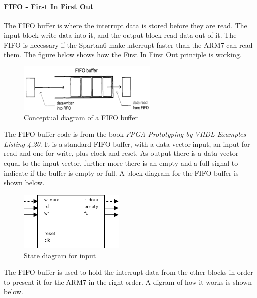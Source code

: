 \paragraph{FIFO - First In First Out}
The FIFO buffer is where the interrupt data is stored before they are read. The input block write data into it, and the output block read data out of it. The FIFO is necessary if the Spartan6 make interrupt faster than the ARM7 can read them. The figure below shows how the First In First Out principle is working.
\begin{figure}[H]
	\begin{centering}
		\includegraphics[width=0.6\textwidth]{images/tb5_fifo.png}
		\caption{Conceptual diagram of a FIFO buffer}
	\end{centering}
\end{figure}
The FIFO buffer code is from the book \textit{FPGA Prototyping by VHDL Examples - Listing 4.20}. It is a standard FIFO buffer, with a data vector input, an input for read and one for write, plus clock and reset. As output there is a data vector equal to the input vector, further more there is an empty and a full signal to indicate if the buffer is empty or full. A block diagram for the FIFO buffer is shown below.
\begin{figure}[H]
	\begin{centering}
		\includegraphics[width=0.45\textwidth]{images/tb5_fifo_block.png}
		\caption{State diagram for input}
	\end{centering}
\end{figure}
The FIFO buffer is used to hold the interrupt data from the other blocks in order to present it for the ARM7 in the right order. A digram of how it works is shown below.
